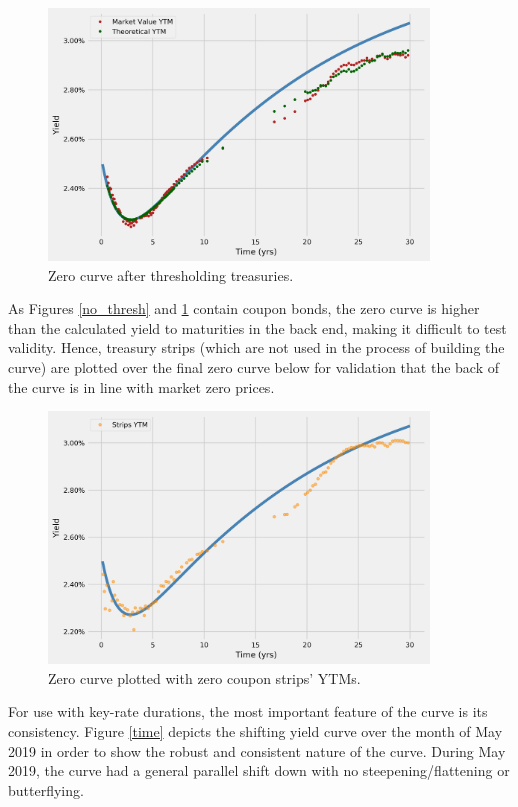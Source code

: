 \documentclass[12pt]{article}
\begin{document}
\begin{figure}[H]
	\centering
	\includegraphics[width=0.9\textwidth]{../../fig/treasury_curves/ytm_threshold}
	\caption{Zero curve after thresholding treasuries. }
	\label{thresh}
\end{figure}


As Figures \ref{no_thresh} and \ref{thresh} contain coupon bonds, the zero curve is higher than the calculated yield to maturities in the back end, making it difficult to test validity. Hence, treasury strips (which are not used in the process of building the curve) are plotted over the final zero curve below for validation that the back of the curve is in line with market zero prices.

\begin{figure}[H]
	\centering
	\includegraphics[width=0.9\textwidth]{../../fig/treasury_curves/strips}
	\caption{Zero curve plotted with zero coupon strips' YTMs.}
\end{figure}

For use with key-rate durations, the most important feature of the curve is its consistency. Figure \ref{time} depicts the shifting yield curve over the month of May 2019 in order to show the robust and consistent nature of the curve. During May 2019, the curve had a general parallel shift down with no steepening/flattening or butterflying.
\end{document}
